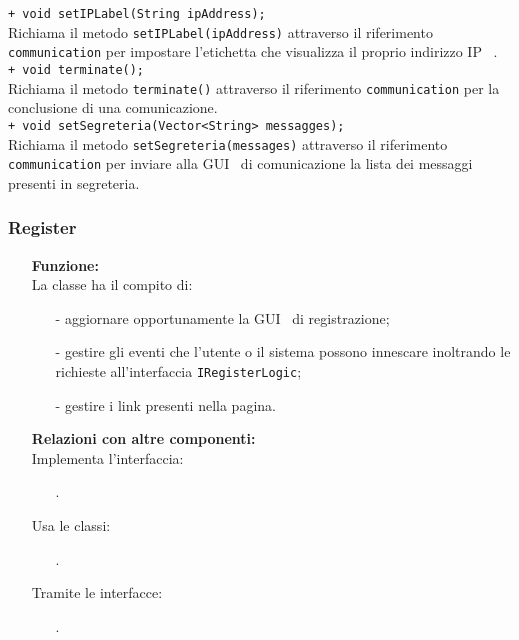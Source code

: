 {\begin{sloppypar}
{{\begin{itemize}
				\texttt{+ void setIPLabel(String ipAddress);}\\
				Richiama il metodo \texttt{setIPLabel(ipAddress)} attraverso il riferimento \texttt{communication} per impostare l'etichetta che visualizza il proprio indirizzo IP\g~ .\\
				
				\texttt{+ void terminate();}\\
				Richiama il metodo \texttt{terminate()} attraverso il riferimento \texttt{communication} per la conclusione di una comunicazione.\\
				
				\texttt{+ void setSegreteria(Vector<String> messagges);}\\
				Richiama il metodo \texttt{setSegreteria(messages)} attraverso il riferimento \texttt{communication} per inviare alla GUI\g~ di comunicazione la lista dei messaggi presenti in segreteria.\\
		\end{itemize}
		}

		\subsubsection{Register}\label{ssub:Register}{
		\begin{itemize}
			\item[] \textbf{Funzione:}\\
				  La classe ha il compito di:
				\begin{itemize}
					\item[-] aggiornare opportunamente la GUI\g~ di registrazione;
					\item[-] gestire gli eventi che l'utente o il sistema possono innescare inoltrando le richieste all'interfaccia \texttt{IRegisterLogic};
					\item[-] gestire i link presenti nella pagina.\\
				\end{itemize}
				
			\item[] \textbf{Relazioni con altre componenti:}\\
				Implementa l'interfaccia:
				\begin{itemize}
					\item[] . 
				\end{itemize}
				Usa le classi:
				\begin{itemize}
					\item[] .
				\end{itemize}
				Tramite le interfacce:
				\begin{itemize}
					\item[] .\\
				\end{itemize}


\end{itemize}}}
\end{sloppypar}}
